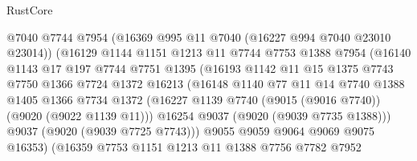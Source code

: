 \begin{lexlean}{RustCore}
\begin{coremodule}
                          @7040
                          @7744
                          @7954
                          (@16369 @995 @11 @7040 (@16227 @994 @7040 @23010 @23014))
                          (@16129
                            @1144
                            @1151
                            @1213
                            @11
                            @7744
                            @7753
                            @1388
                            @7954
                            (@16140
                              @1143
                              @17
                              @197
                              @7744
                              @7751
                              @1395
                              (@16193
                                @1142
                                @11
                                @15
                                @1375
                                @7743
                                @7750
                                @1366
                                @7724
                                @1372
                                @16213
                                (@16148
                                  @1140
                                  @77
                                  @11
                                  @14
                                  @7740
                                  @1388
                                  @1405
                                  @1366
                                  @7734
                                  @1372
                                  (@16227
                                    @1139
                                    @7740
                                    (@9015 (@9016 @7740))
                                    (@9020 (@9022 @1139 @11)))
                                  @16254
                                  @9037
                                  (@9020 (@9039 @7735 @1388)))
                                @9037
                                (@9020 (@9039 @7725 @7743)))
                              @9055
                              @9059
                              @9064
                              @9069
                              @9075
                              @16353)
                            (@16359
                              @7753
                              @1151
                              @1213
                              @11
                              @1388
                              @7756
                              @7782
                              @7952

\end{coremodule}
\end{lexlean}
